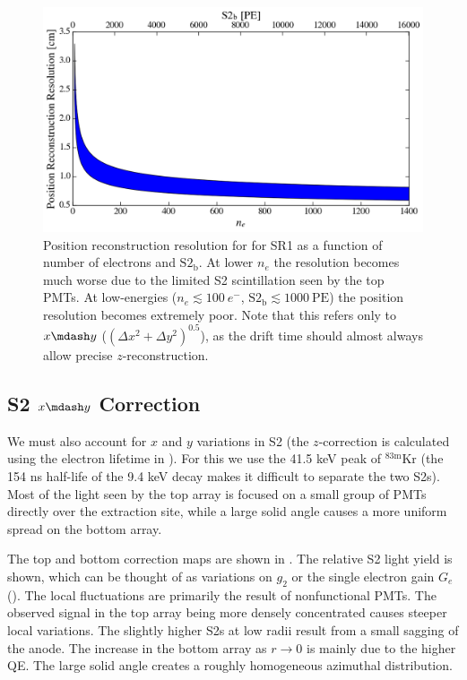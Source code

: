 \begin{figure}
\centering
\includegraphics[width=\textwidth]{PosRecRes}
\caption{Position reconstruction resolution for for SR1 as a function of number of electrons and $\mathrm{S2_b}$.  At lower $n_e$ the
resolution becomes much worse due to the limited S2 scintillation seen by the top PMTs.  At low-energies ($n_e \lesssim 100\ e^-$,
$\mathrm{S2_b} \lesssim 1000\ \mathrm{PE}$) the position resolution becomes extremely poor.  Note that this refers only to $x \mdash y$
($(\Delta x^2 + \Delta y^2)^{0.5}$), as the drift time should almost always allow precise $z$-reconstruction.}
\label{fig:calibrations_position_reconstruction_res}
\end{figure}



\subsection{S2 $x \mdash y$ Correction}
\label{subsec:det_char_s2_position_correction}
We must also account for $x$ and $y$ variations in S2 (the $z$-correction is calculated using the electron lifetime in
).  For
this we use the 41.5 keV peak of $\mathrm{^{83m}Kr}$ (the 154 ns half-life of the 9.4 keV decay makes it difficult to separate the two
S2s).  Most of the light seen by the top array is focused on a small group of PMTs directly over the extraction site, while a large
solid angle causes a more uniform spread on the bottom array.

The top and bottom correction maps are shown in .  The relative S2 light yield is shown, which can be
thought of as variations on $g_2$ or the single electron gain $G_e$ ().  The local
fluctuations are primarily the result
of nonfunctional PMTs.  The observed signal in the top array being more densely concentrated causes steeper local variations.  The
slightly higher S2s at low radii result from a small sagging of the anode.  The increase in the bottom array as $r \rightarrow 0$ is 
mainly due to the higher QE.  The large solid angle creates a roughly homogeneous azimuthal distribution.

